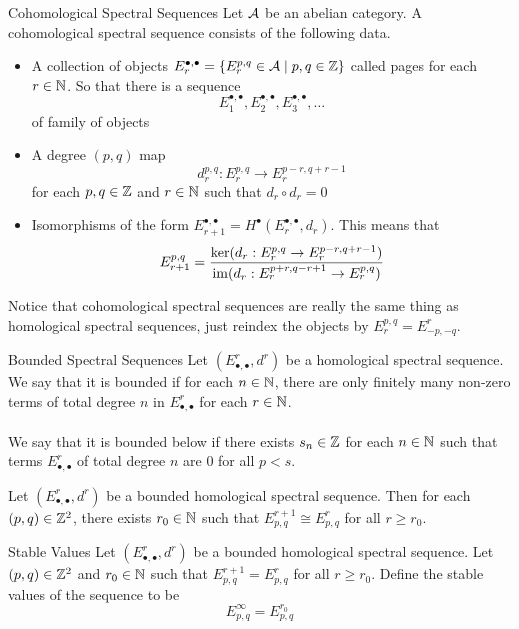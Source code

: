 \documentclass[a4paper]{article}
\begin{document}
\begin{defn}{Cohomological Spectral Sequences}{} Let $\mathcal{A}$ be an abelian category. A cohomological spectral sequence consists of the following data.  
\begin{itemize}
\item A collection of objects $E_r^{\bullet,\bullet}=\{E_r^{p,q}\in\mathcal{A}\;|\;p,q\in\mathbb{Z}\}$ called pages for each $r\in\mathbb{N}$. So that there is a sequence $$E_1^{\bullet,\bullet},E_2^{\bullet,\bullet},E_3^{\bullet,\bullet},\dots$$ of family of objects
\item A degree $(p,q)$ map $$d_r^{p,q}:E_r^{p,q}\to E_r^{p-r,q+r-1}$$ for each $p,q\in\mathbb{Z}$ and $r\in\mathbb{N}$ such that $d_r\circ d_r=0$
\item Isomorphisms of the form $E_{r+1}^{\bullet,\bullet}=H^\bullet(E_r^{\bullet,\bullet},d_r)$. This means that $$E_{r+1}^{p,q}=\frac{\ker(d_r:E_r^{p,q}\to E_r^{p-r,q+r-1})}{\operatorname{im}(d_r:E_r^{p+r,q-r+1}\to E_r^{p,q})}$$
\end{itemize}
\end{defn}

Notice that cohomological spectral sequences are really the same thing as homological spectral sequences, just reindex the objects by $E_r^{p,q}=E_{-p,-q}^r$. 

\begin{defn}{Bounded Spectral Sequences}{} Let $(E_{\bullet,\bullet}^r,d^r)$ be a homological spectral sequence. We say that it is bounded if for each $n\in\mathbb{N}$, there are only finitely many non-zero terms of total degree $n$ in $E_{\bullet,\bullet}^r$ for each $r\in\mathbb{N}$. \\~\\

We say that it is bounded below if there exists $s_n\in\mathbb{Z}$ for each $n\in\mathbb{N}$ such that terms $E_{\bullet,\bullet}^r$ of total degree $n$ are $0$ for all $p<s$. 
\end{defn}

\begin{lmm}{}{} Let $(E_{\bullet,\bullet}^r,d^r)$ be a bounded homological spectral sequence. Then for each $(p,q)\in\mathbb{Z}^2$, there exists $r_0\in\mathbb{N}$ such that $E_{p,q}^{r+1}\cong E_{p,q}^r$ for all $r\geq r_0$. 
\end{lmm}

\begin{defn}{Stable Values}{} Let $(E_{\bullet,\bullet}^r,d^r)$ be a bounded homological spectral sequence. Let $(p,q)\in\mathbb{Z}^2$ and $r_0\in\mathbb{N}$ such that $E_{p,q}^{r+1}=E_{p,q}^r$ for all $r\geq r_0$. Define the stable values of the sequence to be $$E_{p,q}^\infty=E_{p,q}^{r_0}$$
\end{defn}
\end{document}
